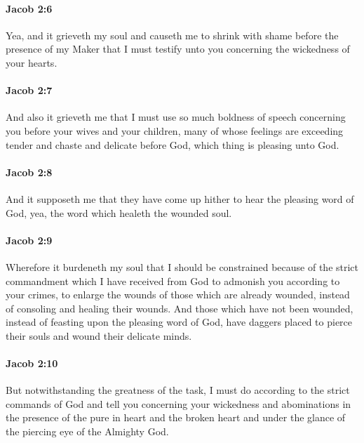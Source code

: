 		\paragraph{Jacob 2:6} %
			\label{JACOB-2-6}

			Yea, and it grieveth my soul and causeth me to shrink with shame
			before the presence of my Maker
			that I must testify unto you concerning the wickedness of your hearts.

		\paragraph{Jacob 2:7} %
			\label{JACOB-2-7}

			And also it grieveth me that I must use so much boldness of speech
			concerning you before your wives and your children,
			many of whose feelings are exceeding tender and chaste and delicate before God,
			which thing is pleasing unto God.

		\paragraph{Jacob 2:8} %
			\label{JACOB-2-8}

			And it supposeth me that they have come up hither
			to hear the pleasing word of God,
			yea, the word which healeth the wounded soul.

		\paragraph{Jacob 2:9} %
			\label{JACOB-2-9}

			Wherefore it burdeneth my soul that I should be constrained
			because of the strict commandment which I have received from God
			to admonish you according to your crimes,
			to enlarge the wounds of those which are already wounded,
			instead of consoling and healing their wounds.
			And those which have not been wounded,
			instead of feasting upon the pleasing word of God,
			have daggers placed to pierce their souls and wound their delicate minds.

		\paragraph{Jacob 2:10} %
			\label{JACOB-2-10}

			But notwithstanding the greatness of the task,
			I must do according to the strict commands of God
			and tell you concerning your wickedness and abominations
			in the presence of the pure in heart and the broken heart
			and under the glance of the piercing eye of the Almighty God.

